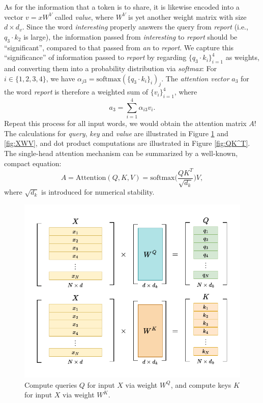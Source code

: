 
As for the information that a token is to share, it is likewise encoded into a vector $v=xW^V$ called \textit{value}, where $W^V$ is yet another weight matrix with size $d \times d_v$. Since the word \textit{interesting} properly answers the query from \textit{report} (i.e., $q_3 \cdot k_2$ is large), the information passed from \textit{interesting} to \textit{report} should be ``significant'', compared to that passed from \textit{an} to \textit{report}. We capture this ``significance'' of information passed to \textit{report} by regarding  $\{q_3 \cdot k_i\}_{i=1}^4$ as weights, and converting them into a probability distribution via \textit{softmax}: For $i \in \{1, 2, 3, 4\}$, we have $\alpha_{j3} =  \text{softmax}(\{q_3 \cdot k_i\}_i)_j$. The \textit{attention vector} $a_3$ for the word \textit{report} is therefore a weighted sum of $\{v_i\}_{i=1}^4$, where 
$$
a_3 = \sum_{i=1}^{4} \alpha_{i3}v_i.
$$
Repeat this process for all input words, we would obtain the attention matrix $A$! The calculations for \textit{query}, \textit{key} and \textit{value} are illustrated in Figure \ref{fig:XWQ_XWK} and \ref{fig:XWV}, and dot product computations are illustrated in Figure \ref{fig:QK^T}. The single-head attention mechanism can be summarized by a well-known, compact equation:
\begin{equation}\label{eq:1}   
    A = \text{Attention}(Q, K, V) = \text{softmax}\bigg({\frac{QK^T}{\sqrt{d_k}}}\bigg)V, 
\end{equation}
where $\sqrt{d_k}$ is introduced for numerical stability.

\begin{figure}
    \centering
    \includegraphics[width=1\linewidth]{fig/XWQ_XWK.pdf}
    \caption{Compute queries $Q$ for input $X$ via weight $W^Q$, and compute keys $K$ for input $X$ via weight $W^K$.}
    \label{fig:XWQ_XWK}
\end{figure}

